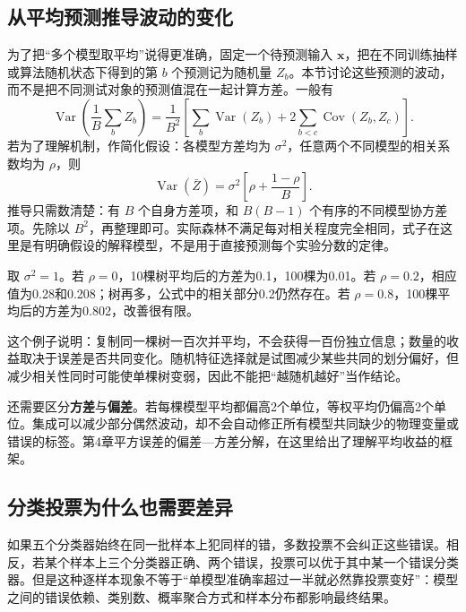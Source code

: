 \subsection{从平均预测推导波动的变化}
为了把“多个模型取平均”说得更准确，固定一个待预测输入 $\mathbf x$，把在不同训练抽样或算法随机状态下得到的第 $b$ 个预测记为随机量 $Z_b$。本节讨论这些预测的波动，而不是把不同测试对象的预测值混在一起计算方差。一般有
\[
\operatorname{Var}\!\left(\frac1B\sum_bZ_b\right)
=\frac1{B^2}\left[\sum_b\operatorname{Var}(Z_b)+2\sum_{b<c}\operatorname{Cov}(Z_b,Z_c)\right].
\]
若为了理解机制，作简化假设：各模型方差均为 $\sigma^2$，任意两个不同模型的相关系数均为 $\rho$，则
\begin{equation}
\operatorname{Var}(\bar Z)=\sigma^2\left[\rho+\frac{1-\rho}{B}\right].
\label{eq:forest-variance}
\end{equation}
推导只需数清楚：有 $B$ 个自身方差项，和 $B(B-1)$ 个有序的不同模型协方差项。先除以 $B^2$，再整理即可。实际森林不满足每对相关程度完全相同，式子在这里是有明确假设的解释模型，不是用于直接预测每个实验分数的定律。

取 $\sigma^2=1$。若 $\rho=0$，10棵树平均后的方差为0.1，100棵为0.01。若 $\rho=0.2$，相应值为0.28和0.208；树再多，公式中的相关部分0.2仍然存在。若 $\rho=0.8$，100棵平均后的方差为0.802，改善很有限。

这个例子说明：复制同一棵树一百次并平均，不会获得一百份独立信息；数量的收益取决于误差是否共同变化。随机特征选择就是试图减少某些共同的划分偏好，但减少相关性同时可能使单棵树变弱，因此不能把“越随机越好”当作结论。


还需要区分\textbf{方差}与\textbf{偏差}。若每棵模型平均都偏高2个单位，等权平均仍偏高2个单位。集成可以减少部分偶然波动，却不会自动修正所有模型共同缺少的物理变量或错误的标签。第4章平方误差的偏差—方差分解，在这里给出了理解平均收益的框架。

\subsection{分类投票为什么也需要差异}
如果五个分类器始终在同一批样本上犯同样的错，多数投票不会纠正这些错误。相反，若某个样本上三个分类器正确、两个错误，投票可以优于其中某一个错误分类器。但是这种逐样本现象不等于“单模型准确率超过一半就必然靠投票变好”：模型之间的错误依赖、类别数、概率聚合方式和样本分布都影响最终结果。

